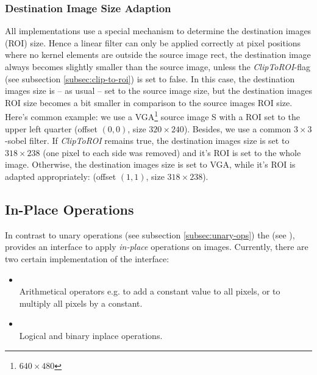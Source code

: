 \subsubsection{Destination Image Size Adaption}
All  implementations use a special mechanism to determine the destination images (ROI) size. Hence a linear filter can only be applied correctly at pixel positions where no kernel elements are outside the source image rect, the destination image always becomes slightly smaller than the source image, unless the \emph{ClipToROI}-flag (see subsection \ref{subsec:clip-to-roi}) is set to false. In this case, the destination images size is -- as usual -- set to the source image size, but the destination images ROI size becomes a bit smaller in comparison to the source images ROI size.\\
Here's common example: we use a VGA\footnote{$640 \times{}480$} source image S with a ROI set to the upper left quarter (offset $(0,0)$, size $320 \times{}240$). Besides, we use a common $3\times{}3$-sobel filter. If \emph{ClipToROI} remains true, the destination images size is set to $318 \times{}238$ (one pixel to each side was removed) and it's ROI is set to the whole image. Otherwise, the destination images size is set to VGA, while it's ROI is adapted appropriately: (offset $(1,1)$, size $318 \times{}238$).



\subsection{In-Place Operations\label{subsec:inplace-ops}}

In contrast to unary operations (see subsection \ref{subsec:unary-ops}) the  (see ), provides an interface to apply \emph{in-place} operations on images. Currently, there are two certain implementation of the  interface:

\begin{itemize}
\item {}\\
Arithmetical operators e.g. to add a constant value to all pixels, or to multiply all pixels by a constant.
\item {}\\
Logical and binary inplace operations. 
\end{itemize}

